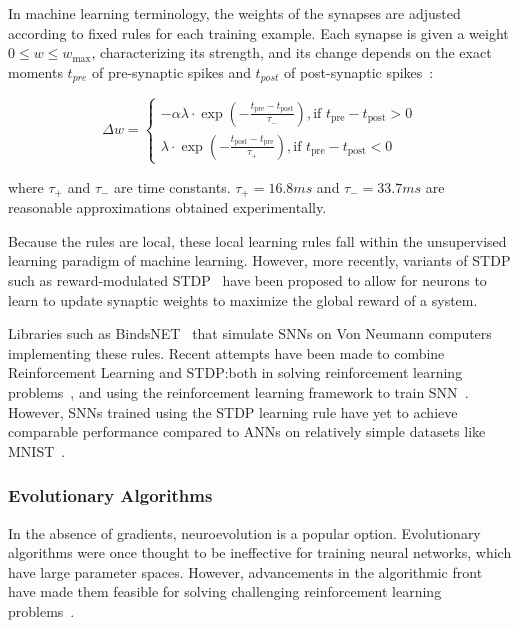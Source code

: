 \documentclass[fyp]{socreport}
\begin{document}
In machine learning terminology, the weights of the synapses are adjusted
according to fixed rules for each training example. Each synapse is given a
weight \(0 \le w \le w_{\max}\), characterizing its strength, and its change
depends on the exact moments \(t_{pre}\) of pre-synaptic spikes and \(t_{post}\)
of post-synaptic spikes~\cite{sboev18_spikin_neural_networ_reinf_learn}:

\begin{equation}
  \Delta w=\left\{\begin{array}{l}{
                    -\alpha \lambda \cdot \exp \left(-\frac{t_{\mathrm{pre}}-t_{\mathrm{post}}}{\tau_{-}}\right),
                    \text {if } t_{\mathrm{pre}}-t_{\mathrm{post}}>0} \\
                    {\lambda \cdot \exp \left(-\frac{t_{\mathrm{post}}-t_{\mathrm{pre}}}{\tau_{+}}\right),
                    \text {if } t_{\mathrm{pre}}-t_{\mathrm{post}}<0}
                  \end{array}\right.
\end{equation}

where \(\tau_{+}\) and \(\tau_{-}\) are time constants. \(\tau_{+} = 16.8ms\)
and \(\tau_{-} = 33.7ms\) are reasonable approximations obtained experimentally.

Because the rules are local, these local learning rules fall within the
unsupervised learning paradigm of machine learning. However, more recently,
variants of STDP such as reward-modulated
STDP~\cite{legenstein08_learn_theor_rewar_modul_spike} have been proposed to
allow for neurons to learn to update synaptic weights to maximize the global
reward of a system.

Libraries such as BindsNET~\cite{10.3389/fninf.2018.00089} that simulate SNNs on
Von Neumann computers implementing these rules. Recent attempts have been made
to combine Reinforcement Learning and STDP:\@ both in solving reinforcement
learning problems~\cite{10.3389/fninf.2018.00089}, and using the reinforcement
learning framework to train
SNN~\cite{10.3389/fnbot.2019.00018,10.3389/fnins.2018.00435}. However, SNNs
trained using the STDP learning rule have yet to achieve comparable performance
compared to ANNs on relatively simple datasets like MNIST~\cite{TAVANAEI201947}.

\subsubsection{Evolutionary Algorithms}

In the absence of gradients, neuroevolution is a popular option. Evolutionary
algorithms were once thought to be ineffective for training neural networks,
which have large parameter spaces. However, advancements in the algorithmic
front have made them feasible for solving challenging reinforcement learning
problems~\cite{such17_deep_neuroev}.
\end{document}
